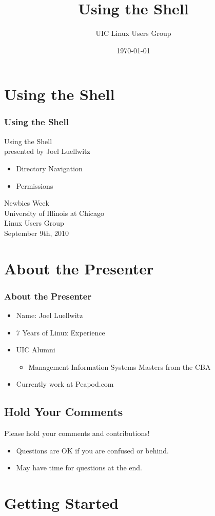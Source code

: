 \documentclass[hyperref={pdfpagelabels=false}]{beamer}
\title{Using the Shell}
\author{UIC Linux Users Group}
\date{\today}
\begin{document}
\frame{\titlepage}
\section{Using the Shell}
\frame
{
    \frametitle{Using the Shell}
    Using the Shell\\
    presented by Joel Luellwitz\\
    \begin{itemize}
    \item{Directory Navigation}
    \item{Permissions}
    \end{itemize}
    Newbies Week\\
    University of Illinois at Chicago\\
    Linux Users Group\\
    September 9th, 2010
}
\section{About the Presenter}
\frame
{
    \frametitle{About the Presenter}
    \begin{itemize}
    \item{Name: Joel Luellwitz}
    \item{7 Years of Linux Experience}
    \item{UIC Alumni}
        \begin{itemize}
        \item{Management Information Systems Masters from the CBA}
        \end{itemize}
    \item{Currently work at Peapod.com}
    \end{itemize}
	
}
\subsection{Hold Your Comments}
\frame
{
Please hold your comments and contributions!
    \begin{itemize}
    \item{Questions are OK if you are confused or behind.}
    \item{May have time for questions at the end.}
    \end{itemize}
}
\section{Getting Started}
\end{document}
